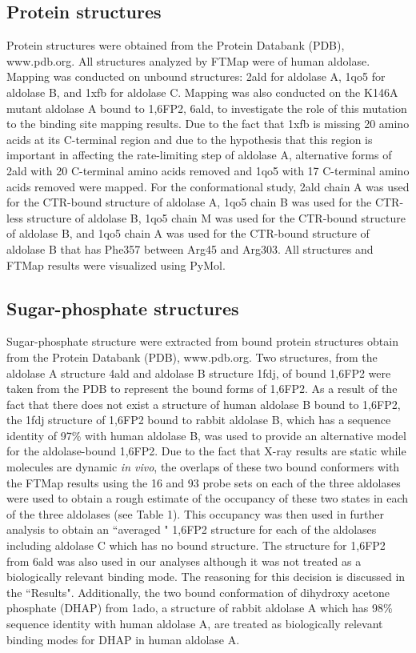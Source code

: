 \documentclass[11pt,a4paper]{article}
\begin{document}
\subsection{Protein structures}
	Protein structures were obtained from the Protein Databank (PDB), www.pdb.org.  All structures analyzed by FTMap were of human aldolase. Mapping was 
	conducted on unbound structures: 2ald for aldolase A, 1qo5 for aldolase B, and 1xfb for aldolase C.  Mapping was also conducted on the K146A mutant
	aldolase A bound to 1,6FP2, 6ald, to investigate the role of this mutation to the binding site mapping results.  Due to the fact that 1xfb is missing
	20 amino acids at its C-terminal region and due to the hypothesis that this region is important in affecting the rate-limiting step of aldolase A, alternative
	forms of 2ald with 20 C-terminal amino acids removed and 1qo5 with 17 C-terminal amino acids removed were mapped.  For the conformational 
	study, 2ald chain A was used for the CTR-bound structure of aldolase A, 1qo5 chain B was used for the CTR-less structure of aldolase B, 1qo5 chain M was
	used for the CTR-bound structure of aldolase B, and 1qo5 chain A was used for the CTR-bound structure of aldolase B that has Phe357 between
	Arg45 and Arg303.
	All structures and FTMap results were visualized using PyMol.

\subsection{Sugar-phosphate structures}
	Sugar-phosphate structure were extracted from bound protein structures obtain from the Protein Databank (PDB), www.pdb.org.  Two structures, 
	from the aldolase A structure 4ald and aldolase B structure 1fdj, of bound 1,6FP2 were taken from the PDB to represent the bound forms of 1,6FP2.  
	As a result of the fact that there does not exist a structure of human aldolase B bound to 1,6FP2, the 1fdj structure of 1,6FP2 bound to rabbit aldolase B, which 
	has a sequence identity of 97\% with human aldolase B, was used to provide an alternative model for the aldolase-bound 1,6FP2.  Due to the fact that
	X-ray results are static while molecules are dynamic \textit{in vivo}, the overlaps of these two bound conformers with the FTMap results using 
	the 16 and 93 probe sets on each of the three aldolases were used to obtain a rough estimate of the occupancy of these two states in each of the 
	three aldolases (see Table 1).  This occupancy was then used in further analysis to obtain an ``averaged " 1,6FP2 structure for each of the aldolases
	including aldolase C which has no bound structure.  The structure for 1,6FP2 from 6ald was also used in our analyses although it was not treated as a biologically 
	relevant binding mode.  The reasoning for this decision is discussed in the ``Results".  Additionally, the two bound conformation of dihydroxy acetone 
	phosphate (DHAP) from 1ado, a structure of rabbit aldolase A  which has 98\% sequence identity with human aldolase A, are 
	treated as biologically relevant binding modes for DHAP in human aldolase A.  
\end{document}
